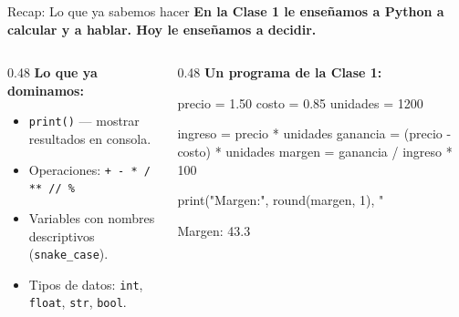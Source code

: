 \documentclass[aspectratio=169, 11pt]{beamer}
\begin{document}
\begin{frame}[fragile,shrink=30]{Recap: Lo que ya sabemos hacer}
  \vspace{-6pt}
  {\small\color{arcaDark}\bfseries
    En la Clase 1 le enseñamos a Python a calcular y a hablar.
    Hoy le enseñamos a \textbf{decidir}.}

  \vspace{6pt}
  \begin{columns}[T]
    \begin{column}{0.48\textwidth}
      {\footnotesize\color{arcaDark}\bfseries Lo que ya dominamos:}

      \vspace{4pt}
      {\footnotesize\color{textMuted}
      \begin{itemize}\setlength{\itemsep}{4pt}
        \item[{\color{codeGreen}\scriptsize\faCheck}]
          \texttt{print()} — mostrar resultados en consola.
        \item[{\color{codeGreen}\scriptsize\faCheck}]
          Operaciones: \texttt{+\,-\,*\,/\,**\,//\,\%}
        \item[{\color{codeGreen}\scriptsize\faCheck}]
          Variables con nombres descriptivos (\texttt{snake\_case}).
        \item[{\color{codeGreen}\scriptsize\faCheck}]
          Tipos de datos: \texttt{int}, \texttt{float},
          \texttt{str}, \texttt{bool}.
      \end{itemize}
      }
    \end{column}

    \begin{column}{0.48\textwidth}
      {\footnotesize\color{arcaDark}\bfseries Un programa de la Clase 1:}

      \vspace{4pt}
      \begin{pyblock}
precio = 1.50
costo  = 0.85
unidades = 1200

ingreso  = precio * unidades
ganancia = (precio - costo) * unidades
margen   = ganancia / ingreso * 100

print("Margen:", round(margen, 1), "%
      \end{pyblock}
      \vspace{-2pt}
      \begin{outputblock}
Margen: 43.3 %
      \end{outputblock}
    \end{column}
  \end{columns}
\end{frame}
\end{document}
